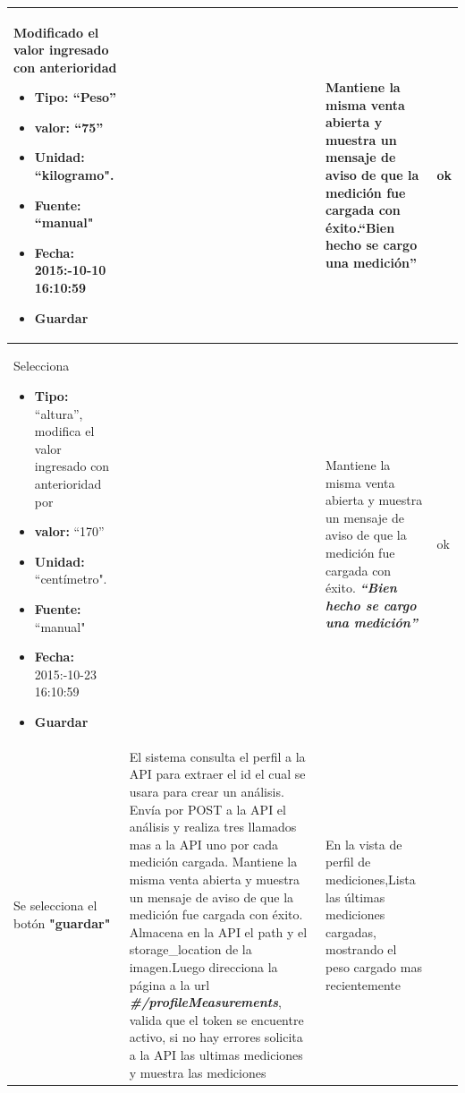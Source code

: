 \begin{longtable}{|p{4cm}|p{4cm}|p{4cm}|p{3cm}|}
Modificado el valor ingresado con anterioridad

\begin{itemize}
	\item \textbf{Tipo:} ``Peso''
	\item \textbf{valor: }``75''
	\item \textbf{Unidad:} ``kilogramo".
	\item \textbf{Fuente: }``manual"
	\item \textbf{Fecha: }2015:-10-10 16:10:59
	\item \textbf{ Guardar}
\end{itemize}
&
& Mantiene la misma venta abierta y muestra un mensaje de aviso de que la
medición fue cargada con éxito.\textbf{``Bien hecho se cargo una medición''}
& ok
\\ \hline




Selecciona



\begin{itemize}
	\item \textbf{Tipo:} ``altura'', modifica el valor ingresado con anterioridad
	por
	\item \textbf{valor: }``170''
	\item \textbf{Unidad:} ``centímetro".
	\item \textbf{Fuente: }``manual"
	\item \textbf{Fecha: }2015:-10-23 16:10:59
	\item \textbf{ Guardar}
\end{itemize}
&
&
Mantiene la misma venta abierta y muestra un mensaje de aviso de que
la medición fue cargada con éxito.\textit{\textbf{ ``Bien hecho se cargo una medición''}}
& ok
\\ \hline




Se selecciona el botón \textbf{"guardar"}
& El sistema consulta el perfil a la API para extraer el id el cual se usara para crear un análisis. Envía por POST a la API el análisis y realiza tres llamados mas a la API uno por cada medición cargada.
Mantiene la misma venta abierta y muestra un mensaje de aviso de que
la medición fue cargada con éxito. Almacena en la API el path y el storage\_location de la imagen.Luego direcciona la página a la url
\textit{\textbf{\#/profileMeasurements}}, valida que el token se encuentre activo, si no hay
errores solicita a la API las ultimas mediciones y muestra las mediciones

& En la vista de perfil de mediciones,Lista las últimas mediciones cargadas,
mostrando el peso cargado mas recientemente


\end{longtable}
